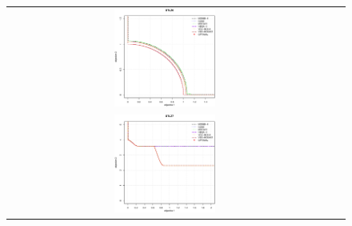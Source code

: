 \begin{figure}[H]
\begin{tabular}{ccc}
  \includegraphics[width=0.33\textwidth]{Figures_Chapter7/Results_Chapter4/Surface_Representative/DTLZ6.eps} \\
  \includegraphics[width=0.33\textwidth]{Figures_Chapter7/Results_Chapter4/Surface_Representative/DTLZ7.eps} 
\end{tabular}
\end{figure}


